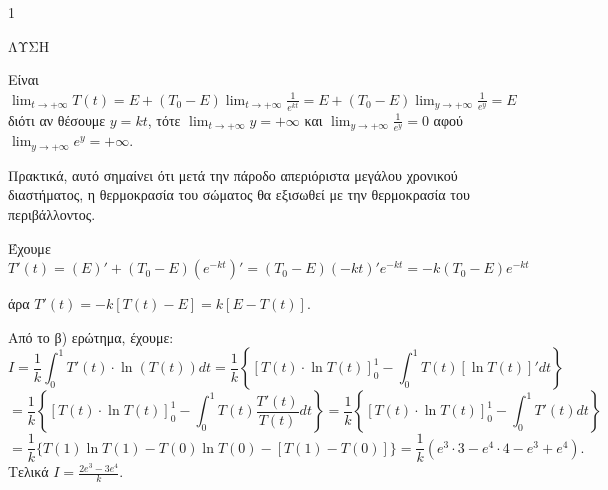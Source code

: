 \begin{ylh}{1}
    \item [Δυναμική θερμοκρασίας, Ολοκλήρωμα]
\end{ylh}
ΛΥΣΗ
\begin{alist}
    \item Είναι $\lim_{t\to+\infty} T(t) = E + (T_0 - E) \lim_{t\to+\infty} \frac{1}{e^{kt}} = E + (T_0 - E) \lim_{y\to+\infty} \frac{1}{e^y} = E$ διότι αν θέσουμε $y = kt$, τότε $\lim_{t\to+\infty} y = +\infty$ και $\lim_{y\to+\infty} \frac{1}{e^y} = 0$ αφού $\lim_{y\to+\infty} e^y = +\infty$.
    
    Πρακτικά, αυτό σημαίνει ότι μετά την πάροδο απεριόριστα μεγάλου χρονικού διαστήματος, η θερμοκρασία του σώματος θα εξισωθεί με την θερμοκρασία του περιβάλλοντος.
    \item Έχουμε $T'(t) = (E)' + (T_0 - E)(e^{-kt})' = (T_0 - E)(-kt)'e^{-kt} = -k(T_0 - E)e^{-kt}$
    
    άρα $T'(t) = -k[T(t) - E] = k[E - T(t)]$.
    \item Από το β) ερώτημα, έχουμε:
    \[ I = \frac{1}{k} \int_0^1 T'(t) \cdot \ln(T(t))dt = \frac{1}{k} \left\{ [T(t) \cdot \ln T(t)]_0^1 - \int_0^1 T(t)[\ln T(t)]'dt \right\} \]
    \[ = \frac{1}{k} \left\{ [T(t) \cdot \ln T(t)]_0^1 - \int_0^1 T(t) \frac{T'(t)}{T(t)} dt \right\} = \frac{1}{k} \left\{ [T(t) \cdot \ln T(t)]_0^1 - \int_0^1 T'(t)dt \right\} \]
    \[ = \frac{1}{k} \{ T(1) \ln T(1) - T(0) \ln T(0) - [T(1) - T(0)] \} = \frac{1}{k} (e^3 \cdot 3 - e^4 \cdot 4 - e^3 + e^4) . \]
    Τελικά $I = \frac{2e^3 - 3e^4}{k}$.
\end{alist}